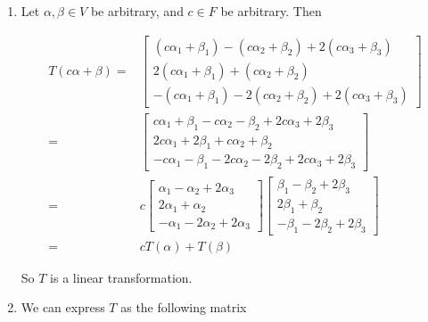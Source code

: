 \documentclass[12pt]{article}
\begin{document}
  {
    \begin{enumerate}[label=(\alph*)]
      \item Let $\alpha, \beta \in V$ be arbitrary, and $c \in F$ be arbitrary.
        Then

        \begin{align*}
          T(c\alpha + \beta) =&\begin{bmatrix}
            (c\alpha_1 + \beta_1) - (c\alpha_2 + \beta_2) + 2(c\alpha_3 + \beta_3) \\
            2(c\alpha_1 + \beta_1) + (c\alpha_2 + \beta_2) \\
            -(c\alpha_1 + \beta_1) - 2(c\alpha_2 + \beta_2) + 2(c\alpha_3 + \beta_3)
          \end{bmatrix} \\
        =&\begin{bmatrix}
            c\alpha_1 + \beta_1 - c\alpha_2 - \beta_2 + 2c\alpha_3 + 2\beta_3 \\
            2c\alpha_1 + 2\beta_1 + c\alpha_2 + \beta_2 \\
            -c\alpha_1 - \beta_1 - 2c\alpha_2  -2\beta_2 + 2c\alpha_3 + 2\beta_3
          \end{bmatrix} \\
        =&c\begin{bmatrix}
            \alpha_1 - \alpha_2 + 2\alpha_3 \\
            2\alpha_1 + \alpha_2 \\
            -\alpha_1 - 2\alpha_2  + 2\alpha_3 
          \end{bmatrix}
          \begin{bmatrix}
            \beta_1 - \beta_2 + 2\beta_3 \\
            2\beta_1 + \beta_2 \\
            - \beta_1 - 2\beta_2 + 2\beta_3
          \end{bmatrix} \\
        =&cT(\alpha) + T(\beta)
        \end{align*}

        So $T$ is a linear transformation.

      \item We can express $T$ as the following matrix


\end{enumerate}}
\end{document}
